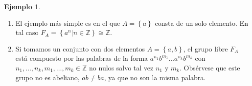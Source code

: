 \documentclass[12pt,a4paper]{book}
\theoremstyle{definition} \newtheorem{defn}[thm]{Definición}
\theoremstyle{definition} \newtheorem{ejemplo}[thm]{Ejemplo}
\theoremstyle{definition} \newtheorem{ejercicio}[thm]{Ejercicio}
\theoremstyle{remark} \newtheorem*{obs}{Observación}
\def\ZZ{\mathbb{Z}}
\begin{document}
 \begin{ejemplo} \leavevmode
   \begin{enumerate}
     \item El ejemplo más simple es en el que $A=\left\{ a \right\}$ consta de un solo elemento. En tal caso $F_{A}=\left\{ a^n|n\in \ZZ \right\}\cong \ZZ$. 

     \item Si tomamos un conjunto con dos elementos $A=\left\{ a,b \right\}$, el grupo libre $F_{A}$ está compuesto por las palabras de la forma $a^{n_1}b^{m_1}\dots a^{n_k}b^{m_k}$ con $n_1,\dots,n_k,m_1,\dots,m_k\in \ZZ$ no nulos salvo tal vez $n_1$ y $m_k$. Obsérvese que este grupo no es abeliano, $ab\neq ba$, ya que no son la misma palabra.
   \end{enumerate}
 \end{ejemplo}
\end{document}
